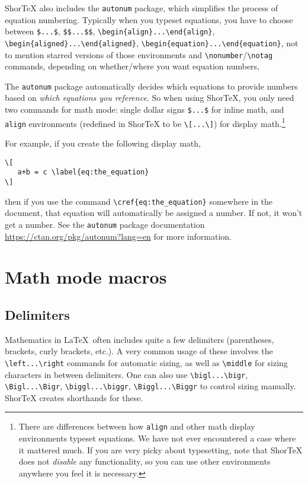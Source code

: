 \documentclass{article}
\begin{document}
ShorTeX also includes the \texttt{autonum} package, which simplifies the process of 
equation numbering. Typically when you typeset equations, you have to choose between 
\verb!$...$!, \verb!$$...$$!, 
\verb!\begin{align}...\end{align}!, 
\verb!\begin{aligned}...\end{aligned}!, 
\verb!\begin{equation}...\end{equation}!, 
not to mention starred versions of those environments 
and \verb!\nonumber!/\verb!\notag! commands, depending 
on whether/where you want equation numbers,

The \texttt{autonum} package automatically decides which equations to provide
numbers based on \textit{which equations you reference}. So when using ShorTeX,
you only need two commands for math mode: single dollar signs \verb!$...$! for
inline math, and \texttt{align} environments (redefined in ShorTeX to be
\verb!\[...\]!) for display math.\footnote{There are
differences between how \texttt{align} and 
other math display environments typeset equations. We have not ever
encountered a case where it mattered much. If you are very picky about typesetting,
note that ShorTeX does not \emph{disable} any functionality, so you 
can use other environments anywhere you feel it is necessary.}

For example, if you create 
the following display math,
\begin{verbatim}
\[
   a+b = c \label{eq:the_equation}
\]
\end{verbatim}
then if you use the command \verb!\cref{eq:the_equation}! somewhere
in the document, that equation will automatically be assigned a number. If not, it
won't get a number. See the \texttt{autonum} package 
documentation \url{https://ctan.org/pkg/autonum?lang=en} for more information.



\section{Math mode macros}

\subsection{Delimiters}

Mathematics in \LaTeX~often includes quite a few delimiters (parentheses, brackets, curly brackets, etc.).
A very common usage of these involves the \verb!\left...\right! commands for automatic sizing, as well as \verb!\middle! 
for sizing characters in between delimiters.
One can also use \verb!\bigl...\bigr!, \verb!\Bigl...\Bigr!, \verb!\biggl...\biggr!, \verb!\Biggl...\Biggr! to control sizing manually.
ShorTeX creates shorthands for these.
\end{document}
